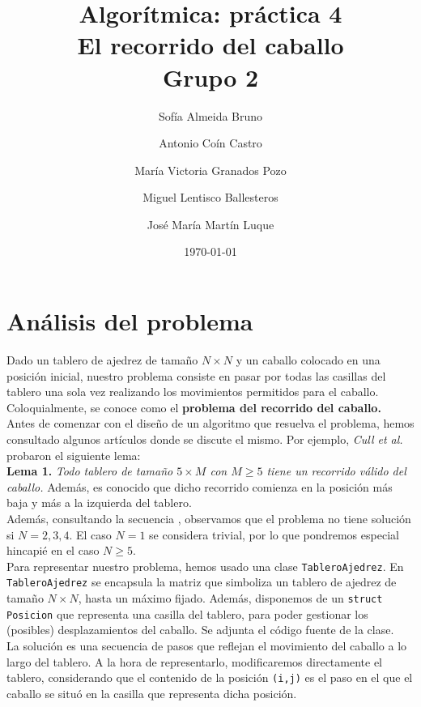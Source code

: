 \documentclass[11pt]{article}
\title{Algorítmica: práctica 4 \\ \large El recorrido del caballo\\ \vspace{0.2em}Grupo 2}
\author{Sofía Almeida Bruno \and Antonio Coín Castro \and María Victoria Granados Pozo \and Miguel Lentisco Ballesteros \and José María Martín Luque}
\date{\today}
\begin{document}
\maketitle

\newpage

\section*{Análisis del problema}

Dado un tablero de ajedrez de tamaño $N\times N$ y un caballo colocado en una posición inicial, nuestro problema consiste en pasar por todas las casillas del tablero una sola vez realizando los movimientos permitidos para el caballo. Coloquialmente, se conoce como el \textbf{problema del recorrido del caballo.}\\

Antes de comenzar con el diseño de un algoritmo que resuelva el problema, hemos consultado algunos artículos donde se discute el mismo. Por ejemplo, \textit{Cull et al.} \cite{cull} probaron el siguiente lema:\\

\textbf{Lema 1.} \textit{Todo tablero de tamaño $5\times M$ con $M\ge5$ tiene un recorrido válido del caballo.} Además, es conocido que dicho recorrido comienza en la posición más baja y más a la izquierda del tablero.\\

Además, consultando la secuencia \cite{sequence}, observamos que el problema no tiene solución si $N=2,3,4$. El caso $N=1$ se considera trivial, por lo que pondremos especial hincapié en el caso $N\ge5$.\\

Para representar nuestro problema, hemos usado una clase \verb|TableroAjedrez|. En \verb|TableroAjedrez| se encapsula la matriz que simboliza un tablero de ajedrez de tamaño $N\times N$, hasta un máximo fijado. Además, disponemos de un \verb|struct Posicion| que representa una casilla del tablero, para poder gestionar los (posibles) desplazamientos del caballo. Se adjunta el código fuente de la clase.\\

La solución es una secuencia de pasos que reflejan el movimiento del caballo a lo largo del tablero. A la hora de representarlo, modificaremos directamente el tablero, considerando que el contenido de la posición \verb|(i,j)| es el paso en el que el caballo se situó en la casilla que representa dicha posición.
\end{document}
